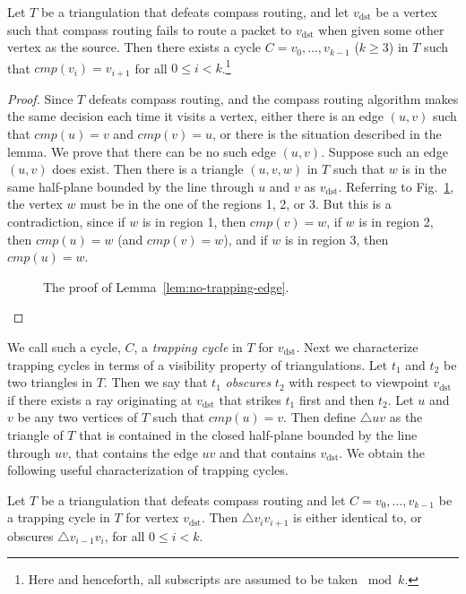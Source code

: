\documentclass[final]{siamltex}
\newcommand{\centeripe}[1]{\begin{center}\Ipe{#1}\end{center}}
\newcommand{\figlabel}[1]{\label{fig:#1}}
\newcommand{\figref}[1]{\mbox{Fig.~\ref{fig:#1}}}
\newcommand{\lemlabel}[1]{\label{lem:#1}}
\newcommand{\lemref}[1]{Lemma~\ref{lem:#1}}
\newcommand{\vdest}{v_\mathrm{dst}}
\newcommand{\compass}[1]{\mathit{cmp}(#1)}
\begin{document}
\begin{lemma}\lemlabel{no-trapping-edge}
Let $T$ be a triangulation that defeats compass routing, and let
$\vdest$ be a vertex such that compass routing fails to route a packet
to $\vdest$ when given some other vertex as the source.  Then there
exists a cycle $C=v_0,\ldots,v_{k-1}$ ($k\ge 3$) in $T$ such that
$\compass{v_i}=v_{i+1}$ for all $0\le i< k$.\footnote{Here and
henceforth, all subscripts are assumed to be taken $\bmod k$.}
\end{lemma}

\begin{proof}
Since $T$ defeats compass routing, and the compass routing algorithm
makes the same decision each time it visits a vertex, either there is
an edge $(u,v)$ such that $\compass{u}=v$ and $\compass{v}=u$, or
there is the situation described in the lemma.  We prove that there
can be no such edge $(u,v)$.  
Suppose such an edge $(u,v)$ does exist.  Then there is a triangle
$(u,v,w)$ in $T$ such that $w$ is in the same half-plane bounded by
the line through $u$ and $v$ as $\vdest$.  Referring to
\figref{trapping-edge}, the vertex $w$ must be in the one of the
regions 1, 2, or 3.  But this is a contradiction, since if $w$ is in
region 1, then $\compass{v}=w$, if $w$ is in region 2, then
$\compass{u}=w$ (and $\compass{v}=w$), and if $w$ is in region 3, then
$\compass{u}=w$.
\begin{figure}
\centeripe{compass-noedge-proof}
\caption{The proof of \lemref{no-trapping-edge}.}
\figlabel{trapping-edge}
\end{figure}
\qquad\end{proof}

We call such a cycle, $C$, a {\em trapping cycle\/} in $T$ for
$\vdest$.  Next we characterize trapping cycles in terms of a
visibility property of triangulations.  Let $t_1$ and $t_2$ be two
triangles in $T$.  Then we say that $t_1$ {\em obscures\/} $t_2$ with
respect to viewpoint $\vdest$ if there exists a ray originating at
$\vdest$ that strikes $t_1$ first and then $t_2$.  Let $u$ and $v$ be
any two vertices of $T$ such that $\compass{u}=v$.  Then define
$\triangle uv$ as the triangle of $T$ that is contained in the closed
half-plane bounded by the line through $uv$, that contains the edge
$uv$ and that contains $\vdest$.  We obtain the following useful
characterization of trapping cycles.

\begin{lemma}\lemlabel{cyclic-overlap}
Let $T$ be a triangulation that defeats compass routing and let
$C=v_0,\ldots,v_{k-1}$ be a trapping cycle in $T$ for vertex $\vdest$.
Then $\triangle v_i v_{i+1}$ is either identical to, or obscures
$\triangle v_{i-1} v_i$, for all $0\le i < k$.
\end{lemma}
\end{document}
